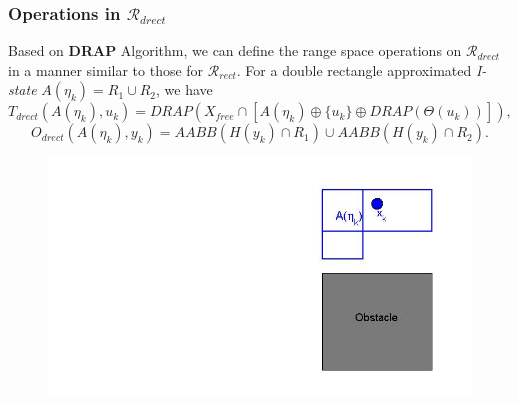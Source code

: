 \documentclass[compress]{beamer}
\begin{document}
\begin{frame} \frametitle{Operations in $\mathcal{R}_{drect}$}

Based on \textbf{DRAP} Algorithm, we can define the range space operations on
$\mathcal{R}_{drect}$ in a manner similar to those for $\mathcal{R}_{rect}$.  For a double rectangle
approximated \emph{I-state} $A(\eta_k) = R_1 \cup R_2$, we have
\begin{equation}
	T_{drect}(A(\eta_k), u_k) = DRAP(X_{free} \cap [A(\eta_k) \oplus \{ u_k \} \oplus DRAP(\Theta(u_k))]),
\end{equation}
\begin{equation}
	O_{drect}(A(\eta_k), y_k) = AABB(H(y_k) \cap R_1)\cup AABB(H(y_k) \cap R_2).
\end{equation}
\begin{figure}
    \includegraphics[scale=0.3]{drectevolve0.jpg}
    \end{figure}
\transboxout
\end{frame}
\end{document}
